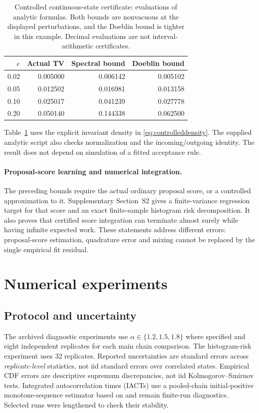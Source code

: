 \documentclass[pdflatex,iicol,sn-mathphys-ay]{sn-jnl}
\theoremstyle{definition}\newtheorem{definition}[theorem]{Definition}
\theoremstyle{remark}\newtheorem{remark}[theorem]{Remark}
\numberwithin{equation}{section}
\newcommand{\1}{\mathbf 1}
\begin{document}
\begin{table}[t]\centering
\caption{Controlled continuous-state certificate: evaluations of analytic formulas. Both bounds are nonvacuous at the displayed perturbations, and the Doeblin bound is tighter in this example. Decimal evaluations are not interval-arithmetic certificates.}\label{tab:certificate}
\begin{tabular}{rrrr}\toprule $e$&Actual TV&Spectral bound&Doeblin bound\\\midrule
0.02&0.005000&0.006142&0.005102\\
0.05&0.012502&0.016981&0.013158\\
0.10&0.025017&0.041239&0.027778\\
0.20&0.050140&0.144338&0.062500\\
\bottomrule\end{tabular}\end{table}
Table~\ref{tab:certificate} uses the explicit invariant density in \eqref{eq:controlleddensity}. The supplied analytic script also checks normalization and the incoming/outgoing identity. The result does not depend on simulation of a fitted acceptance rule.

\paragraph{Proposal-score learning and numerical integration.}
The preceding bounds require the actual ordinary proposal score, or a controlled approximation to it. Supplementary Section~S2 gives a finite-variance regression target for that score and an exact finite-sample histogram risk decomposition. It also proves that certified score integration can terminate almost surely while having infinite expected work. These statements address different errors: proposal-score estimation, quadrature error and mixing cannot be replaced by the single empirical fit residual.

\section{Numerical experiments}\label{sec:numerics}
\subsection{Protocol and uncertainty}
The archived diagnostic experiments use $\alpha\in\{1.2,\allowbreak1.5,\allowbreak1.8\}$ where specified and eight independent replicates for each main chain comparison. The histogram-risk experiment uses 32 replicates. Reported uncertainties are standard errors across \emph{replicate-level} statistics, not iid standard errors over correlated states. Empirical CDF errors are descriptive supremum discrepancies, not iid Kolmogorov--Smirnov tests. Integrated autocorrelation times (IACTs) use a pooled-chain initial-positive monotone-sequence estimator based on \citet{geyer} and remain finite-run diagnostics. Selected runs were lengthened to check their stability.
\end{document}
